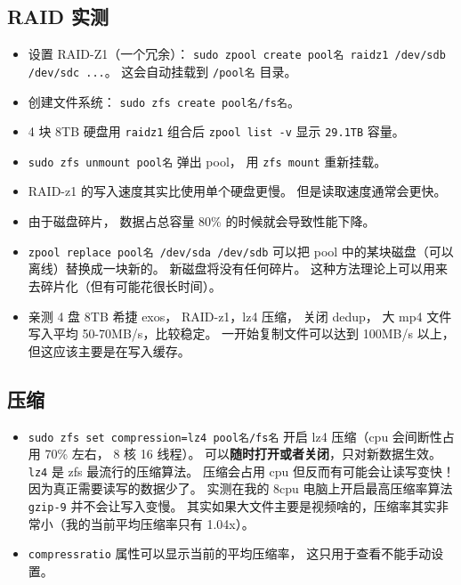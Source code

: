 \subsection{RAID 实测}
\begin{itemize}
\item 设置 RAID-Z1（一个冗余）： \verb|sudo zpool create pool名 raidz1 /dev/sdb /dev/sdc ...|。 这会自动挂载到 \verb|/pool名| 目录。
\item 创建文件系统： \verb|sudo zfs create pool名/fs名|。
\item 4 块 8TB 硬盘用 \verb|raidz1| 组合后 \verb|zpool list -v| 显示 \verb|29.1TB| 容量。
\item \verb|sudo zfs unmount pool名| 弹出 pool， 用 \verb|zfs mount| 重新挂载。
\item RAID-z1 的写入速度其实比使用单个硬盘更慢。 但是读取速度通常会更快。
\item 由于磁盘碎片， 数据占总容量 80\% 的时候就会导致性能下降。
\item \verb|zpool replace pool名 /dev/sda /dev/sdb| 可以把 pool 中的某块磁盘（可以离线）替换成一块新的。 新磁盘将没有任何碎片。 这种方法理论上可以用来去碎片化（但有可能花很长时间）。
\item 亲测 4 盘 8TB 希捷 exos， RAID-z1，lz4 压缩， 关闭 dedup， 大 mp4 文件写入平均 50-70MB/s，比较稳定。 一开始复制文件可以达到 100MB/s 以上，但这应该主要是在写入缓存。
\end{itemize}

\subsection{压缩}
\begin{itemize}
\item \verb|sudo zfs set compression=lz4 pool名/fs名| 开启 lz4 压缩（cpu 会间断性占用 70\% 左右， 8 核 16 线程）。 可以\textbf{随时打开或者关闭}，只对新数据生效。 \verb|lz4| 是 zfs 最流行的压缩算法。 压缩会占用 cpu 但反而有可能会让读写变快！ 因为真正需要读写的数据少了。 实测在我的 8cpu 电脑上开启最高压缩率算法 \verb|gzip-9| 并不会让写入变慢。 其实如果大文件主要是视频啥的，压缩率其实非常小（我的当前平均压缩率只有 1.04x）。
\item \verb|compressratio| 属性可以显示当前的平均压缩率， 这只用于查看不能手动设置。
\end{itemize}

